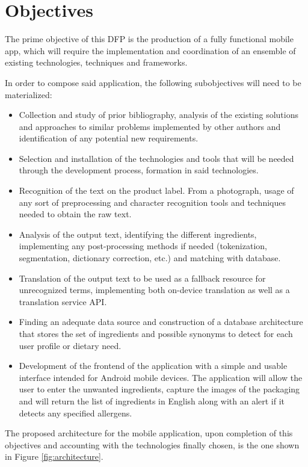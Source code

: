 \section{Objectives}

The prime objective of this DFP is the production of a fully functional mobile app, which will require the implementation and coordination of an ensemble of existing technologies, techniques and frameworks.

In order to compose said application, the following subobjectives will need to be materialized:

\begin{itemize}
\item Collection and study of prior bibliography, analysis of the existing solutions and approaches to similar problems implemented by other authors and identification of any potential new requirements.
\item Selection and installation of the technologies and tools that will be needed through the development process, formation in said technologies.
\item Recognition of the text on the product label. From a photograph, usage of any sort of preprocessing \cite{noauthor_optical_2021} and character recognition \cite{islam_survey_2016} tools and techniques needed to obtain the raw text.
\item Analysis of the output text, identifying the different ingredients, implementing any post-processing methods if needed (tokenization, segmentation, dictionary correction, etc.) \cite{kargin_nlp_2021} and matching with database.
\item Translation of the output text to be used as a fallback resource for unrecognized terms, implementing both on-device translation as well as a translation service API.
\item Finding an adequate data source and construction of a database architecture that stores the set of ingredients and possible synonyms to detect for each user profile or dietary need.
\item Development of the frontend of the application with a simple and usable interface intended for Android mobile devices. The application will allow the user to enter the unwanted ingredients, capture the images of the packaging and will return the list of ingredients in English along with an alert if it detects any specified allergens.
\end{itemize}

The proposed architecture for the mobile application, upon completion of this objectives and accounting with the technologies finally chosen, is the one shown in Figure \ref{fig:architecture}.

